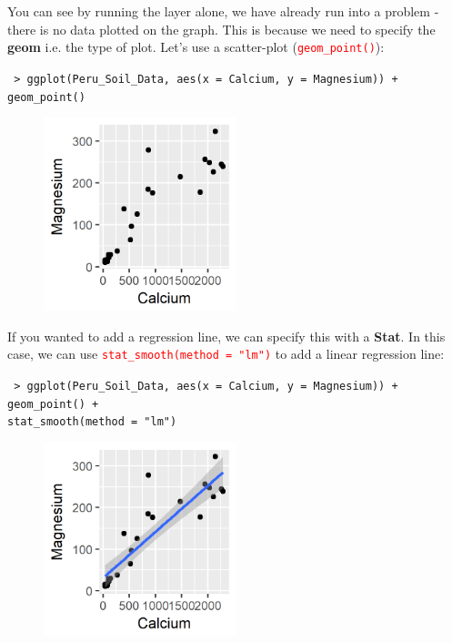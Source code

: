 \documentclass[a4paper,12pt]{article}
\newcommand\code[1]{\textcolor{red}{\texttt{#1}}}
\begin{document}
You can see by running the layer alone, we have already run into a problem - there is no data plotted on the graph. This is because we need to specify the \textbf{geom} i.e. the type of plot. Let's use a scatter-plot (\code{geom\_point()}):

\begin{shaded}
\texttt{ > ggplot(Peru\_Soil\_Data, aes(x = Calcium, y = Magnesium)) + \\
\hspace*{1cm} geom\_point()}
\end{shaded}

\begin{figure}[h]
	\centering
	\includegraphics[width=0.5\textwidth]{figs/fig1.png}
	\label{fig:fig1}
\end{figure}

If you wanted to add a regression line, we can specify this with a \textbf{Stat}. In this case, we can use \code{stat\_smooth(method = "lm")} to add a linear regression line:

\begin{shaded}
\texttt{ > ggplot(Peru\_Soil\_Data, aes(x = Calcium, y = Magnesium)) + \\
\hspace*{1cm} geom\_point() + \\
\hspace*{1cm} stat\_smooth(method = "lm")}
\end{shaded}

\begin{figure}[h]
	\centering
	\includegraphics[width=0.5\textwidth]{figs/fig2.png}
	\label{fig:fig2}
\end{figure}
\end{document}
